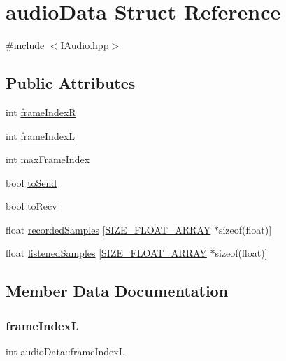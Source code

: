 \hypertarget{structaudioData}{}\section{audio\+Data Struct Reference}
\label{structaudioData}


{\ttfamily \#include $<$I\+Audio.\+hpp$>$}

\subsection*{Public Attributes}
\begin{DoxyCompactItemize}
\item 
int \hyperlink{structaudioData_af63786604a8510d4374fe0f95f4683fd}{frame\+IndexR}
\item 
int \hyperlink{structaudioData_a77ae41741248611b009f6b8ff4b76682}{frame\+IndexL}
\item 
int \hyperlink{structaudioData_a44fb6293eca03b922781b878462a6ae9}{max\+Frame\+Index}
\item 
bool \hyperlink{structaudioData_ae77d23a63dc014afa358ac3de5f25bde}{to\+Send}
\item 
bool \hyperlink{structaudioData_ab253b532ad74a4fe9c6937f4299662da}{to\+Recv}
\item 
float \hyperlink{structaudioData_a594d65587293f4eae35f590a9902c178}{recorded\+Samples} \mbox{[}\hyperlink{IAudio_8hpp_a7b18daf241cd649f29e47ba8e42dea03}{S\+I\+Z\+E\+\_\+\+F\+L\+O\+A\+T\+\_\+\+A\+R\+R\+AY} $\ast$sizeof(float)\mbox{]}
\item 
float \hyperlink{structaudioData_a875583eaf09d008f1586ae800b5d11d6}{listened\+Samples} \mbox{[}\hyperlink{IAudio_8hpp_a7b18daf241cd649f29e47ba8e42dea03}{S\+I\+Z\+E\+\_\+\+F\+L\+O\+A\+T\+\_\+\+A\+R\+R\+AY} $\ast$sizeof(float)\mbox{]}
\end{DoxyCompactItemize}


\subsection{Member Data Documentation}
\mbox{\label{structaudioData_a77ae41741248611b009f6b8ff4b76682}} 
\subsubsection{\texorpdfstring{frame\+IndexL}{frameIndexL}}
{\footnotesize\ttfamily int audio\+Data\+::frame\+IndexL}

